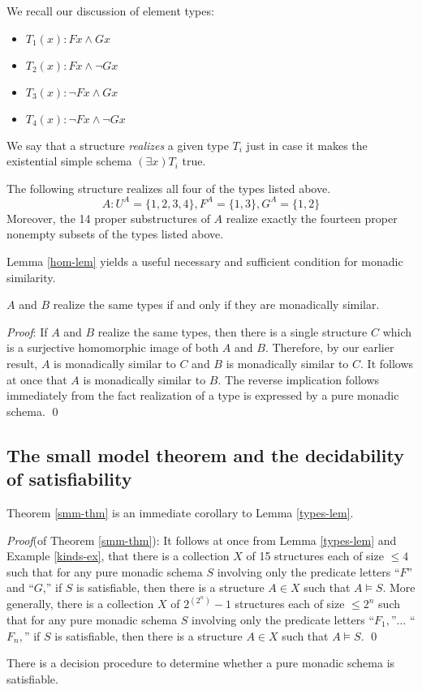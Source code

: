 We recall our discussion of element types:
\begin{itemize}
\item $T_1(x): Fx\wedge Gx$
\item $T_2(x): Fx\wedge \neg Gx$
\item $T_3(x): \neg Fx\wedge Gx$
\item $T_4(x): \neg Fx\wedge \neg Gx$
\end{itemize}
We say that a structure {\em realizes} a given type $T_i$ just in case it
makes the existential simple schema $(\exists x)T_i$ true.
\begin{example}\label{kinds-ex}
The following structure realizes all four of the types listed above.
\[A: U^A = \{1,2,3,4\}, F^A =\{1,3\}, G^A=\{1,2\}\]
Moreover, the 14 proper substructures of $A$ realize exactly the fourteen
proper nonempty subsets of the types listed above.
\end{example}
Lemma \ref{hom-lem} yields a useful necessary and sufficient condition for monadic similarity. 
\begin{lemma}\label{types-lem}
$A$ and $B$ realize the same types if and only if they are
monadically similar.
\end{lemma} 
\emph{Proof}:
If $A$ and $B$ realize the same types, then there is a single
structure $C$ which is a surjective homomorphic image of both $A$ and $B.$
Therefore, by our earlier result, $A$ is monadically similar to $C$ and $B$ is
monadically similar to $C.$ It follows at once that $A$ is monadically similar
to $B.$ The reverse implication follows immediately from the fact realization of a type is expressed by a pure monadic schema. \qed
\subsection{The small model theorem and the decidability of satisfiability}

Theorem \ref{smm-thm} is an immediate corollary to Lemma \ref{types-lem}.

\emph{Proof}(of Theorem \ref{smm-thm}):
It follows at once from Lemma \ref{types-lem} and Example \ref{kinds-ex}, that there is a collection $X$ of 15 structures each of size $\leq 4$
such that for any pure monadic schema $S$ involving only the predicate letters
``$F$'' and ``$G$,'' if $S$ is satisfiable, then there is a structure $A \in X$
such that $A \models S.$ 
More generally, there is a collection $X$ of $2^{(2^n)}-1$ structures each of size $\leq 2^n$
such that for any pure monadic schema $S$ involving only the predicate letters
``$F_1,$''$\ldots$ ``$F_n,$'' if $S$ is satisfiable, then there is a structure $A \in X$
such that $A \models S.$ \qed
\begin{corollary}
There is a decision procedure to determine whether a pure
monadic schema is satisfiable.
\end{corollary}
